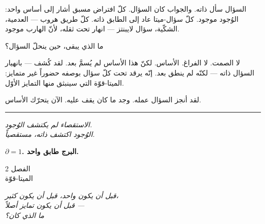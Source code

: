 \documentclass[10pt, openany, oneside]{book}
\renewcommand{\large}{\fontsize{11.5}{14}\selectfont}
\renewcommand{\huge}{\fontsize{17}{21}\selectfont}
\begin{document}
\vspace{1.5em}


السؤال سأل ذاته. والجواب كان السؤال. كلّ افتراض مسبق أشار إلى أساس واحد: الوُجود موجود. كلّ سؤال-ميتا عاد إلى الطابق ذاته. كلّ طريق هروب --- العدمية، الشكّية، سؤال لايبنتز --- انهار تحت ثقله، لأنّ الهارب موجود.

ما الذي يبقى، حين ينحلّ السؤال؟

لا الصمت. لا الفراغ. الأساس. لكنّ هذا الأساس لم يُسمَّ بعد. لقد كُشف --- بانهيار السؤال ذاته --- لكنّه لم ينطق بعد. إنّه يرقد تحت كلّ سؤال بوصفه حضوراً غير متمايز: الميتا-قوّة التي سينبثق منها التمايز الأوّل.

لقد أنجز السؤال عمله. وجد ما كان يقف عليه. الآن يتحرّك الأساس.

\vspace{2em}

\begin{center}
    \rule{0.15\textwidth}{0.3pt}
\end{center}

\vspace{0.5em}

\begin{center}
    \itshape
    الاستقصاء لم يكتشف الوُجود.\\
    الوُجود اكتشف ذاته، مستقصياً.
\end{center}

\vspace{0.5em}

\begin{center}
    \textbf{$\partial = 1$. البرج طابق واحد.}
\end{center}

%
%
%

\newpage

\begin{center}
    {\huge الفصل 2}\\[0.3em]
    {\large الميتا-قوّة}
\end{center}

\vspace{1.5em}

\begin{center}
    \itshape
    قبل أن يكون واحد، قبل أن يكون كثير،\\
    قبل أن يكون تمايز أصلاً ---\\
    ما الذي كان؟
\end{center}
\end{document}
